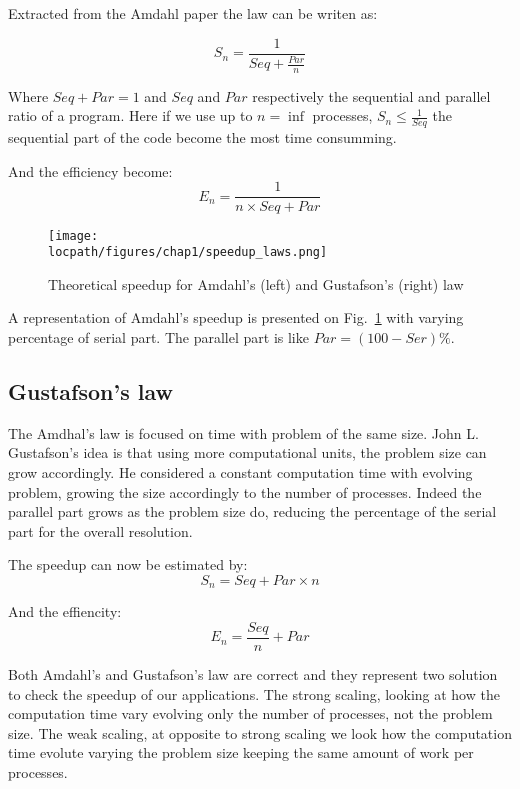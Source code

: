 Extracted from the Amdahl paper the law can be writen as: 

\begin{equation}
S_n = \frac{1}{Seq + \frac{Par}{n}}
\end{equation}

Where $Seq + Par = 1$ and $Seq$ and $Par$ respectively the sequential and parallel ratio of a program.
Here if we use up to $n=\inf$ processes, $S_n \leq \frac{1}{Seq}$ the sequential part of the code become the most time consumming. 

And the efficiency become:
\begin{equation}
E_n = \frac{1}{n\times Seq + Par}
\end{equation}

\begin{figure}
\texttt{[image: \\locpath/figures/chap1/speedup\_laws.png]}
\caption{Theoretical speedup for Amdahl's (left) and Gustafson's (right) law}
\label{fig:1_HPC:speedup_laws}
\end{figure}

A representation of Amdahl's speedup is presented on Fig.~\ref{fig:1_HPC:speedup_laws} with varying percentage of serial part. 
The parallel part is like $Par = (100-Ser)\%$.

\subsection{Gustafson's law}
The Amdhal's law is focused on time with problem of the same size. 
John L. Gustafson's idea is that using more computational units, the problem size can grow accordingly. 
He considered a constant computation time with evolving problem, growing the size accordingly to the number of processes. 
Indeed the parallel part grows as the problem size do, reducing the percentage of the serial part for the overall resolution.

The speedup can now be estimated by:
\begin{equation}
S_n = Seq + Par \times n
\end{equation}

And the effiencity: 
\begin{equation}
E_n = \frac{Seq}{n} + Par
\end{equation}


Both Amdahl's and Gustafson's law are correct and they represent two solution to check the speedup of our applications. 
The strong scaling, looking at how the computation time vary evolving only the number of processes, not the problem size. 
The weak scaling, at opposite to strong scaling we look how the computation time evolute varying the problem size keeping the same amount of work per processes. 

